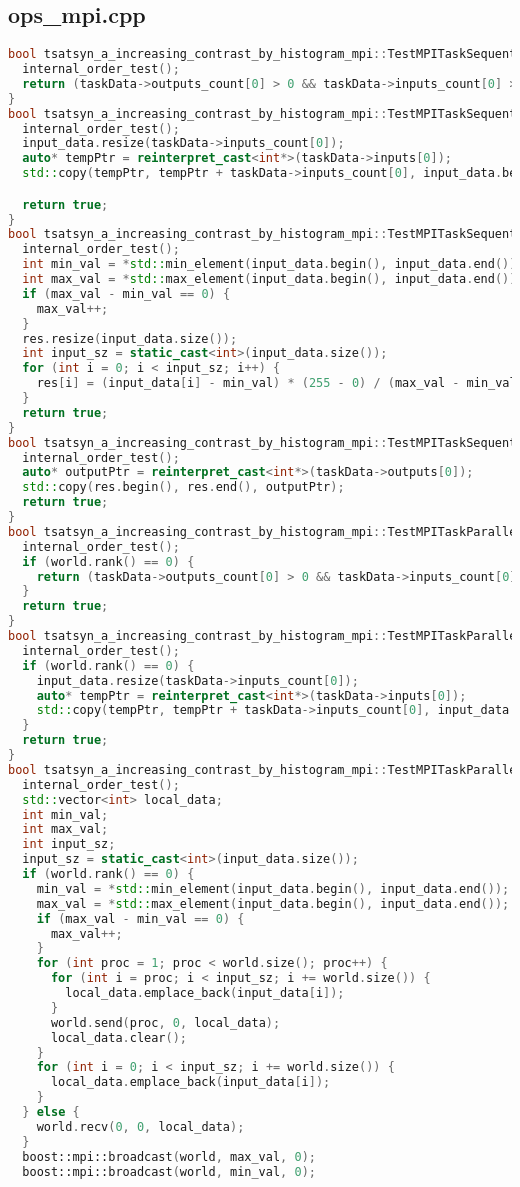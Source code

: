 \documentclass[a4paper,12pt]{article}
\begin{document}
\subsection{ops\_mpi.cpp}
\begin{lstlisting}[language=C++]
bool tsatsyn_a_increasing_contrast_by_histogram_mpi::TestMPITaskSequential::validation() {
  internal_order_test();
  return (taskData->outputs_count[0] > 0 && taskData->inputs_count[0] > 0);
}
bool tsatsyn_a_increasing_contrast_by_histogram_mpi::TestMPITaskSequential::pre_processing() {
  internal_order_test();
  input_data.resize(taskData->inputs_count[0]);
  auto* tempPtr = reinterpret_cast<int*>(taskData->inputs[0]);
  std::copy(tempPtr, tempPtr + taskData->inputs_count[0], input_data.begin());

  return true;
}
bool tsatsyn_a_increasing_contrast_by_histogram_mpi::TestMPITaskSequential::run() {
  internal_order_test();
  int min_val = *std::min_element(input_data.begin(), input_data.end());
  int max_val = *std::max_element(input_data.begin(), input_data.end());
  if (max_val - min_val == 0) {
    max_val++;
  }
  res.resize(input_data.size());
  int input_sz = static_cast<int>(input_data.size());
  for (int i = 0; i < input_sz; i++) {
    res[i] = (input_data[i] - min_val) * (255 - 0) / (max_val - min_val) + 0;
  }
  return true;
}
bool tsatsyn_a_increasing_contrast_by_histogram_mpi::TestMPITaskSequential::post_processing() {
  internal_order_test();
  auto* outputPtr = reinterpret_cast<int*>(taskData->outputs[0]);
  std::copy(res.begin(), res.end(), outputPtr);
  return true;
}
bool tsatsyn_a_increasing_contrast_by_histogram_mpi::TestMPITaskParallel::validation() {
  internal_order_test();
  if (world.rank() == 0) {
    return (taskData->outputs_count[0] > 0 && taskData->inputs_count[0] > 0);
  }
  return true;
}
bool tsatsyn_a_increasing_contrast_by_histogram_mpi::TestMPITaskParallel::pre_processing() {
  internal_order_test();
  if (world.rank() == 0) {
    input_data.resize(taskData->inputs_count[0]);
    auto* tempPtr = reinterpret_cast<int*>(taskData->inputs[0]);
    std::copy(tempPtr, tempPtr + taskData->inputs_count[0], input_data.begin());
  }
  return true;
}
bool tsatsyn_a_increasing_contrast_by_histogram_mpi::TestMPITaskParallel::run() {
  internal_order_test();
  std::vector<int> local_data;
  int min_val;
  int max_val;
  int input_sz;
  input_sz = static_cast<int>(input_data.size());
  if (world.rank() == 0) {
    min_val = *std::min_element(input_data.begin(), input_data.end());
    max_val = *std::max_element(input_data.begin(), input_data.end());
    if (max_val - min_val == 0) {
      max_val++;
    }
    for (int proc = 1; proc < world.size(); proc++) {
      for (int i = proc; i < input_sz; i += world.size()) {
        local_data.emplace_back(input_data[i]);
      }
      world.send(proc, 0, local_data);
      local_data.clear();
    }
    for (int i = 0; i < input_sz; i += world.size()) {
      local_data.emplace_back(input_data[i]);
    }
  } else {
    world.recv(0, 0, local_data);
  }
  boost::mpi::broadcast(world, max_val, 0);
  boost::mpi::broadcast(world, min_val, 0);


\end{lstlisting}
\end{document}
